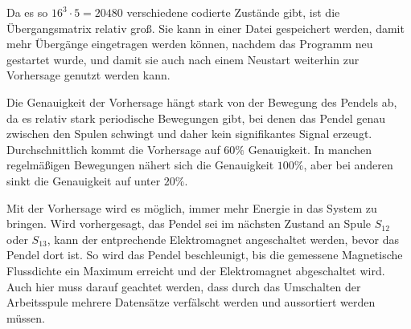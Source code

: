 Da es so $16^3 \cdot 5 = 20480$ verschiedene codierte Zustände gibt, ist die Übergangsmatrix relativ groß.
Sie kann in einer Datei gespeichert werden, damit mehr Übergänge eingetragen werden können, nachdem das Programm neu gestartet wurde, und damit sie auch nach einem Neustart weiterhin zur Vorhersage
genutzt werden kann.

Die Genauigkeit der Vorhersage hängt stark von der Bewegung des Pendels ab, da es relativ stark periodische Bewegungen gibt, bei denen das Pendel genau zwischen den Spulen schwingt und daher kein signifikantes Signal erzeugt.
Durchschnittlich kommt die Vorhersage auf $60\%$ Genauigkeit.
In manchen regelmäßigen Bewegungen nähert sich die Genauigkeit $100\%$, aber bei anderen sinkt die Genauigkeit auf unter $20\%$.

Mit der Vorhersage wird es möglich, immer mehr Energie in das System zu bringen.
Wird vorhergesagt, das Pendel sei im nächsten Zustand an Spule $S_{12}$ oder $S_{13}$, kann der entprechende Elektromagnet angeschaltet werden, bevor das Pendel dort ist.
So wird das Pendel beschleunigt, bis die gemessene Magnetische Flussdichte ein Maximum erreicht und der Elektromagnet abgeschaltet wird.
Auch hier muss darauf geachtet werden, dass durch das Umschalten der Arbeitsspule mehrere Datensätze verfälscht werden und aussortiert werden müssen.

